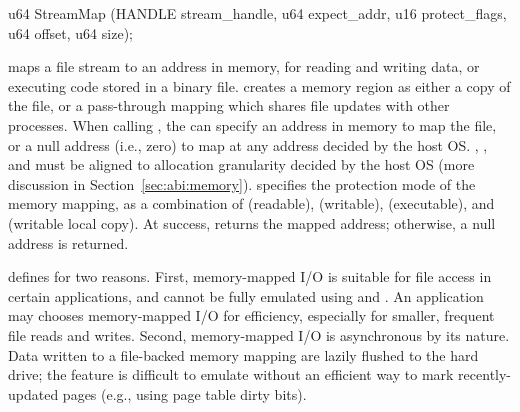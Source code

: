  








                   
\begin{paldef}            
u64 StreamMap (HANDLE stream_handle, u64 expect_addr,
               u16 protect_flags, u64 offset, u64 size);
\end{paldef}


 maps a file stream to an address in memory, for reading and writing data, or executing code stored in a binary file.
 creates a memory region
as either a copy of the file,
or a pass-through mapping which shares file updates with other processes.
When calling ,
the \libos{} can specify an address in memory to map the file, or a null address (i.e., zero) to map at any address decided by the host OS.
, , and  must be aligned
to allocation granularity decided by the host OS (more discussion in Section~\ref{sec:abi:memory}).
 specifies the protection mode
of the memory mapping, as a combination of  (readable),  (writable),  (executable), and  (writable local copy).
At success,  returns the mapped address; otherwise, a null address is returned.




\Thehostabi{} defines  for two reasons. First, memory-mapped I/O is suitable for file access in certain applications, and cannot be fully emulated
using  and .
An application may chooses memory-mapped I/O for
efficiency, %
especially for smaller, frequent file reads and writes.
Second, memory-mapped I/O is asynchronous by its nature.
Data written to a file-backed memory mapping are lazily flushed to the hard drive;
the feature is difficult to emulate
without an efficient way to mark recently-updated pages (e.g., using page table dirty bits).




